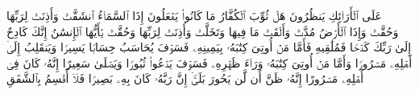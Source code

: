 \startbuffer[\q:83:35]
عَلَى ٱلۡأَرَاۤئِكِ یَنظُرُونَ%
\stopbuffer%
\startbuffer[\q:83:36]
هَلۡ ثُوِّبَ ٱلۡكُفَّارُ مَا كَانُوا۟ یَفۡعَلُونَ%
\stopbuffer%
\startbuffer[\q:84:1]
إِذَا ٱلسَّمَاۤءُ ٱنشَقَّتۡ%
\stopbuffer%
\startbuffer[\q:84:2]
وَأَذِنَتۡ لِرَبِّهَا وَحُقَّتۡ%
\stopbuffer%
\startbuffer[\q:84:3]
وَإِذَا ٱلۡأَرۡضُ مُدَّتۡ%
\stopbuffer%
\startbuffer[\q:84:4]
وَأَلۡقَتۡ مَا فِیهَا وَتَخَلَّتۡ%
\stopbuffer%
\startbuffer[\q:84:5]
وَأَذِنَتۡ لِرَبِّهَا وَحُقَّتۡ%
\stopbuffer%
\startbuffer[\q:84:6]
یَٰۤأَیُّهَا ٱلۡإِنسَٰنُ إِنَّكَ كَادِحٌ إِلَىٰ رَبِّكَ كَدۡحࣰا فَمُلَٰقِیهِ%
\stopbuffer%
\startbuffer[\q:84:7]
فَأَمَّا مَنۡ أُوتِیَ كِتَٰبَهُۥ بِیَمِینِهِۦ%
\stopbuffer%
\startbuffer[\q:84:8]
فَسَوۡفَ یُحَاسَبُ حِسَابࣰا یَسِیرࣰا%
\stopbuffer%
\startbuffer[\q:84:9]
وَیَنقَلِبُ إِلَىٰۤ أَهۡلِهِۦ مَسۡرُورࣰا%
\stopbuffer%
\startbuffer[\q:84:10]
وَأَمَّا مَنۡ أُوتِیَ كِتَٰبَهُۥ وَرَاۤءَ ظَهۡرِهِۦ%
\stopbuffer%
\startbuffer[\q:84:11]
فَسَوۡفَ یَدۡعُوا۟ ثُبُورࣰا%
\stopbuffer%
\startbuffer[\q:84:12]
وَیَصۡلَىٰ سَعِیرًا%
\stopbuffer%
\startbuffer[\q:84:13]
إِنَّهُۥ كَانَ فِیۤ أَهۡلِهِۦ مَسۡرُورًا%
\stopbuffer%
\startbuffer[\q:84:14]
إِنَّهُۥ ظَنَّ أَن لَّن یَحُورَ%
\stopbuffer%
\startbuffer[\q:84:15]
بَلَىٰۤۚ إِنَّ رَبَّهُۥ كَانَ بِهِۦ بَصِیرࣰا%
\stopbuffer%
\startbuffer[\q:84:16]
فَلَاۤ أُقۡسِمُ بِٱلشَّفَقِ%
\stopbuffer%
